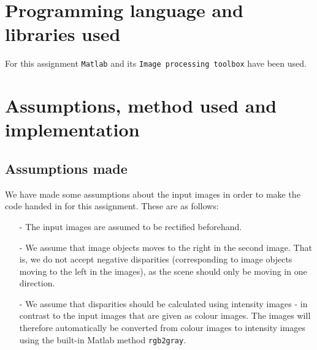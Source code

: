 \documentclass[12pt,a4paper,oneside,final]{article}
\begin{document}
	
	\section{Programming language and libraries used}
	For this assignment \texttt{Matlab} and its \texttt{Image processing toolbox} have been used.
	
	\section{Assumptions, method used and implementation}
	
	\subsection{Assumptions made}
	We have made some assumptions about the input images in order to make the code handed in for this assignment. These are as follows:
	\begin{itemize}
		\item[-] The input images are assumed to be rectified beforehand.
		\item[-] We assume that image objects moves to the right in the second image.  That is, we do not accept negative disparities (corresponding to image objects moving to the left in the images), as the scene should only be moving in one direction.
		\item[-] We assume that disparities should be calculated using intensity images - in contrast to the input images that are given as colour images. The images will therefore automatically be converted from colour images to intensity images using the built-in Matlab method \texttt{rgb2gray}.
	\end{itemize}
	
\end{document}
